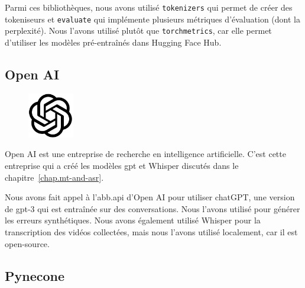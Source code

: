 Parmi ces bibliothèques, nous avons utilisé \verb|tokenizers| qui permet de créer des tokeniseurs
et \verb|evaluate| qui implémente plusieurs métriques d'évaluation (dont la perplexité).
Nous l'avons utilisé plutôt que \verb|torchmetrics|, 
car elle permet d'utiliser les modèles pré-entraînés dans \foreignlanguage{english}{Hugging Face Hub}.

\subsection{\foreignlanguage{english}{Open AI}}
\label{subsec.openai}

\begin{figure}
    \vspace*{-\topsep}
    \begin{flushright}
        \includegraphics[width=2cm]{assets/images/openai.png}
    \end{flushright}
\end{figure}
\foreignlanguage{english}{Open AI} est une entreprise de recherche en intelligence artificielle.
C'est cette entreprise qui a créé les modèles \gls{gpt} et Whisper discutés dans le chapitre~\ref{chap.mt-and-asr}.

Nous avons fait appel à l'\gls{abb.api} d'\foreignlanguage{english}{Open AI} pour utiliser chatGPT,
une version de \gls{gpt}-3 qui est entraînée sur des conversations.
Nous l'avons utilisé pour générer les erreurs synthétiques.
Nous avons également utilisé Whisper pour la transcription des vidéos collectées,
mais nous l'avons utilisé localement, car il est open-source.

\subsection{Pynecone}
\label{subsec.pynecone}


